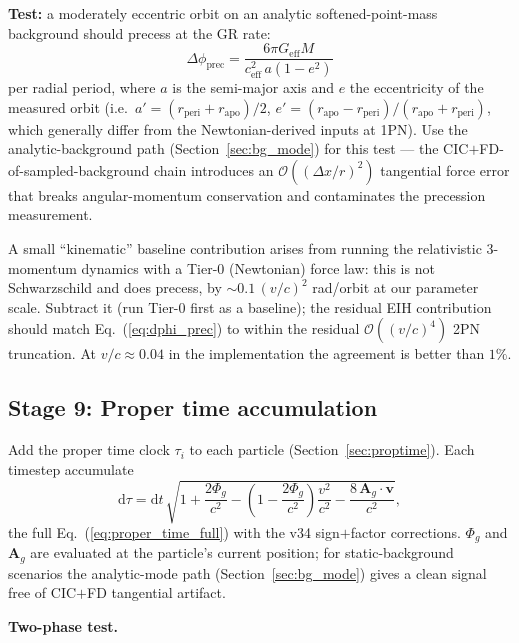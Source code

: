 \documentclass[11pt,a4paper]{article}
\newcommand{\vv}[1]{\mathbf{#1}}
\newcommand{\Phig}{\Phi_g}
\newcommand{\Ag}{\vv{A}_g}
\newcommand{\order}[1]{\mathcal{O}(#1)}
\newcommand{\dd}{\mathrm{d}}
\begin{document}
\textbf{Test:} a moderately eccentric orbit on an analytic
softened-point-mass background should precess at the GR rate:
\begin{equation}
\label{eq:dphi_prec}
  \Delta\phi_{\mathrm{prec}} = \frac{6\pi G_{\mathrm{eff}} M}{c_{\mathrm{eff}}^2\,a(1-e^2)}
\end{equation}
per radial period, where $a$ is the semi-major axis and $e$ the eccentricity
of the measured orbit (i.e.\ $a' = (r_{\mathrm{peri}}+r_{\mathrm{apo}})/2$,
$e' = (r_{\mathrm{apo}}-r_{\mathrm{peri}})/(r_{\mathrm{apo}}+r_{\mathrm{peri}})$,
which generally differ from the Newtonian-derived inputs at 1PN).  Use the
analytic-background path (Section~\ref{sec:bg_mode}) for this test ---
the CIC$+$FD-of-sampled-background chain introduces an
$\order{(\Delta x/r)^2}$ tangential force error that breaks angular-momentum
conservation and contaminates the precession measurement.

A small ``kinematic'' baseline contribution arises from running the
relativistic 3-momentum dynamics with a Tier-0 (Newtonian) force law:
this is not Schwarzschild and does precess, by $\sim 0.1\,(v/c)^2$ rad/orbit
at our parameter scale.  Subtract it (run Tier-0 first as a baseline);
the residual EIH contribution should match Eq.~(\ref{eq:dphi_prec}) to
within the residual $\order{(v/c)^4}$ 2PN truncation.  At
$v/c \approx 0.04$ in the implementation the agreement is better than
$1\%$.

\subsection{Stage 9: Proper time accumulation}
\label{sec:stage_proper_time}

Add the proper time clock $\tau_i$ to each particle (Section~\ref{sec:proptime}).
Each timestep accumulate
\begin{equation}
\label{eq:dtau_step}
  \dd\tau = \dd t\,\sqrt{1 + \frac{2\Phig}{c^2} - \left(1-\frac{2\Phig}{c^2}\right)\frac{v^2}{c^2} - \frac{8\,\Ag\!\cdot\!\vv{v}}{c^2}},
\end{equation}
the full Eq.~(\ref{eq:proper_time_full}) with the v34 sign$+$factor
corrections.  $\Phig$ and $\Ag$ are evaluated at the particle's current
position; for static-background scenarios the analytic-mode path
(Section~\ref{sec:bg_mode}) gives a clean signal free of CIC$+$FD tangential
artifact.

\textbf{Two-phase test.}
\end{document}
